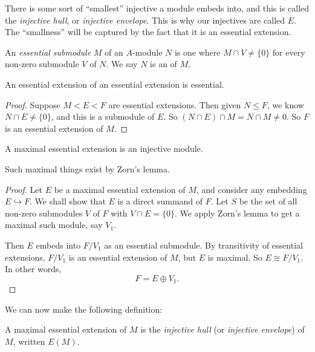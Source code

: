 \documentclass[a4paper]{article}
\begin{document}
There is some sort of ``smallest'' injective a module embeds into, and this is called the \emph{injective hull}, or \emph{injective envelope}. This is why our injectives are called $E$. The ``smallness'' will be captured by the fact that it is an essential extension.

\begin{defi}
  An \emph{essential submodule} $M$ of an $A$-module $N$ is one where $M \cap V \not= \{0\}$ for every non-zero submodule $V$ of $N$. We say $N$ is an  of $M$.
\end{defi}

\begin{lemma}
  An essential extension of an essential extension is essential.
\end{lemma}

\begin{proof}
  Suppose $M < E < F$ are essential extensions. Then given $N \leq F$, we know $N \cap E \not= \{0\}$, and this is a submodule of $E$. So $(N \cap E) \cap M = N \cap M \not= 0$. So $F$ is an essential extension of $M$.
\end{proof}

\begin{lemma}
  A maximal essential extension is an injective module.
\end{lemma}
Such maximal things exist by Zorn's lemma.

\begin{proof}
  Let $E$ be a maximal essential extension of $M$, and consider any embedding $E \hookrightarrow F$. We shall show that $E$ is a direct summand of $F$. Let $S$ be the set of all non-zero submodules $V$ of $F$ with $V \cap E = \{0\}$. We apply Zorn's lemma to get a maximal such module, say $V_1$.

  Then $E$ embeds into $F/V_1$ as an essential submodule. By transitivity of essential extensions, $F/V_1$ is an essential extension of $M$, but $E$ is maximal. So $E \cong F/V_1$. In other words,
  \[
    F = E \oplus V_1.
  \]
\end{proof}
We can now make the following definition:
\begin{defi}
  A maximal essential extension of $M$ is the \emph{injective hull} (or \emph{injective envelope}) of $M$, written $E(M)$.
\end{defi}
\end{document}
